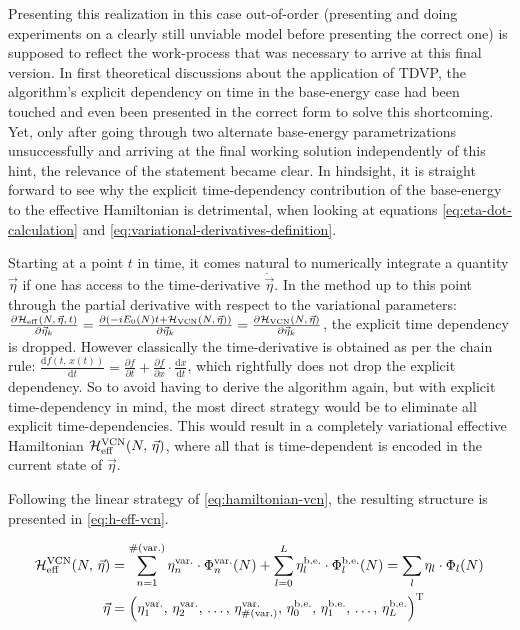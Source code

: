 Presenting this realization in this case out-of-order (presenting and doing experiments on a clearly still unviable model before presenting the correct one) is supposed to reflect the work-process that was necessary to arrive at this final version.
In first theoretical discussions about the application of TDVP, the algorithm's explicit dependency on time in the base-energy case had been touched and even been presented in the correct form to solve this shortcoming.
Yet, only after going through two alternate base-energy parametrizations unsuccessfully and arriving at the final working solution independently of this hint, the relevance of the statement became clear.
In hindsight, it is straight forward to see why the explicit time-dependency contribution of the base-energy to the effective Hamiltonian is detrimental, when looking at equations \ref{eq:eta-dot-calculation} and \ref{eq:variational-derivatives-definition}.

Starting at a point $t$ in time, it comes natural to numerically integrate a quantity $\vec{\eta}$ if one has access to the time-derivative $\dot{\vec{\eta}}$.
In the method up to this point through the partial derivative with respect to the variational parameters: $\frac{\partial \HeffOft[N,\,\vec{\eta}]}{\partial \vec{\eta}_k} = \frac{\partial \left(-i E_0(N) t + \Hvcn{\vec{\eta}}\right)}{\partial \vec{\eta}_k} = \frac{\partial \Hvcn{\vec{\eta}} }{\partial \vec{\eta}_k}$, the explicit time dependency is dropped.
However classically the time-derivative is obtained as per the chain rule:
$\frac{\mathrm{d} f(t,\,x(t))}{\mathrm{d} t} = \frac{\partial f}{\partial t} + \frac{\partial f}{\partial x} \cdot \frac{\mathrm{d} x}{\mathrm{d} t}$, which rightfully does not drop the explicit dependency.
So to avoid having to derive the algorithm again, but with explicit time-dependency in mind, the most direct strategy would be to eliminate all explicit time-dependencies.
This would result in a completely variational effective Hamiltonian ${\mathcal{H}_\text{eff}^\text{VCN}}({N},\,\vec{\eta})$, where all that is time-dependent is encoded in the current state of $\vec{\eta}$.

Following the linear strategy of \autoref{eq:hamiltonian-vcn}, the resulting structure is presented in \autoref{eq:h-eff-vcn}.

\begin{equation}
    \label{eq:h-eff-vcn}
    \begin{split}
        \Heffvcn{N}{\vec{\eta}} &= \sum\limits_{n=1}^{\text{\#}(\text{var.})} \eta^\text{var.}_{n} \cdot \Phi^\text{var.}_{n}(N)
        + \sum\limits_{l=0}^{L} \eta^\text{b.e.}_{l} \cdot \Phi^\text{b.e.}_{l}(N)
         = \lsum[l] \eta_l \cdot \Phi_l(N)\\
         \vec{\eta} &= \left(
            \eta^\text{var.}_{1},\,\eta^\text{var.}_{2},\, \dots,\, \eta^\text{var.}_{\text{\#}(\text{var.})},\,
            \eta^\text{b.e.}_{0},\,\eta^\text{b.e.}_{1},\, \dots,\, \eta^\text{b.e.}_{L}
           \right)^\text{T}
    \end{split}
\end{equation}

